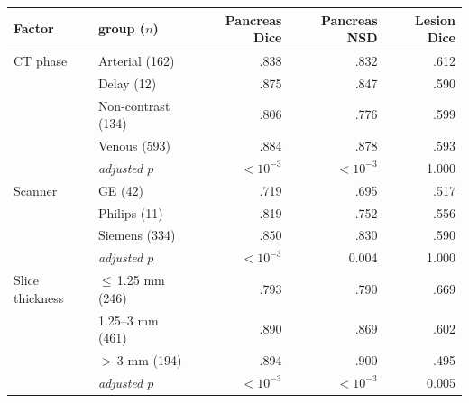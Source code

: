 \begin{tabular}{llrrr}
\toprule
Factor & group ($n$) & Pancreas Dice & Pancreas NSD & Lesion Dice \\
\midrule
CT phase & Arterial (162) & .838 & .832 & .612 \\
 & Delay (12) & .875 & .847 & .590 \\
 & Non-contrast (134) & .806 & .776 & .599 \\
 & Venous (593) & .884 & .878 & .593 \\
 & \emph{adjusted $p$} & $<\!10^{-3}$ & $<\!10^{-3}$ & 1.000 \\ \midrule
Scanner & GE (42) & .719 & .695 & .517 \\
 & Philips (11) & .819 & .752 & .556 \\
 & Siemens (334) & .850 & .830 & .590 \\
 & \emph{adjusted $p$} & $<\!10^{-3}$ & 0.004 & 1.000 \\ \midrule
Slice thickness & $\le$\,1.25 mm (246) & .793 & .790 & .669 \\
 & 1.25--3 mm (461) & .890 & .869 & .602 \\
 & $>$\,3 mm (194) & .894 & .900 & .495 \\
 & \emph{adjusted $p$} & $<\!10^{-3}$ & $<\!10^{-3}$ & 0.005 \\
\bottomrule
\end{tabular}
